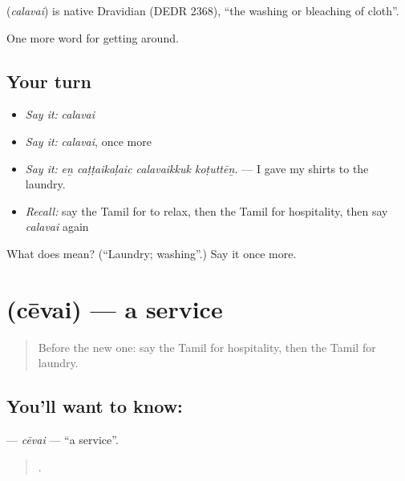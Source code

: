 \begin{cousinweb}
\textbf{} (\emph{calavai}) is native Dravidian (DEDR 2368), \textquotedblleft{}the washing or bleaching of cloth\textquotedblright{}.
\end{cousinweb}

\begin{grammarlens}[title={What you've built}]
One more word for getting around.
\end{grammarlens}

\subsection*{Your turn}
\begin{itemize}
\raggedright
  \item \emph{Say it:} \emph{calavai}
  \item \emph{Say it:} \emph{calavai}, once more
  \item \emph{Say it:} \emph{eṉ caṭṭaikaḷaic calavaikkuk koṭuttēṉ.} — I gave my shirts to the laundry.
  \item \emph{Recall:} say the Tamil for to relax, then the Tamil for hospitality, then say \emph{calavai} again
\end{itemize}

\begin{tcolorbox}[breakable,colback=teal!4,colframe=teal!35!black,title={Before you move on}]
What does  mean? (\textquotedblleft{}Laundry; washing\textquotedblright{}.) Say it once more.
\end{tcolorbox}
\section[\texorpdfstring{\ta{சேவை} (cēvai)}{சேவை (cēvai)}]{ (cēvai) — a service}

\label{lesson:TA-C420-cevai}



\begin{quote}
Before the new one: say the Tamil for hospitality, then the Tamil for laundry.
\end{quote}

\subsection*{You'll want to know: }
\textbf{} — \emph{cēvai} — \textquotedblleft{}a service\textquotedblright{}.

\begin{quote}
     .
\end{quote}


